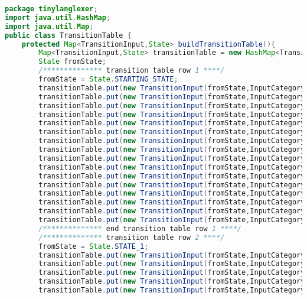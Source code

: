 \begin{lstlisting}[basicstyle=\miniscule,language=Java,caption=Implementation of transition table,label=listing:transition table]
package tinylanglexer;
import java.util.HashMap;
import java.util.Map;
public class TransitionTable {
	protected Map<TransitionInput,State> buildTransitionTable(){
		Map<TransitionInput,State> transitionTable = new HashMap<TransitionInput,State>();
		State fromState;
		/************** transition table row 1 ****/
		fromState = State.STARTING_STATE;
		transitionTable.put(new TransitionInput(fromState,InputCategory.LETTER), State.STATE_4);
		transitionTable.put(new TransitionInput(fromState,InputCategory.DIGIT), State.STATE_11);
		transitionTable.put(new TransitionInput(fromState,InputCategory.UNDERSCORE), State.STATE_4);
		transitionTable.put(new TransitionInput(fromState,InputCategory.SLASH_DIVIDE), State.STATE_5);
		transitionTable.put(new TransitionInput(fromState,InputCategory.ASTERISK), State.STATE_14);
		transitionTable.put(new TransitionInput(fromState,InputCategory.LESS_THAN), State.STATE_16);
		transitionTable.put(new TransitionInput(fromState,InputCategory.GREATER_THAN), State.STATE_16);
		transitionTable.put(new TransitionInput(fromState,InputCategory.PLUS), State.STATE_14);
		transitionTable.put(new TransitionInput(fromState,InputCategory.HYPHEN_MINUS), State.STATE_15);
		transitionTable.put(new TransitionInput(fromState,InputCategory.EQUAL), State.STATE_16);
		transitionTable.put(new TransitionInput(fromState,InputCategory.EXCLAMATION_MARK), State.STATE_17);
		transitionTable.put(new TransitionInput(fromState,InputCategory.DOT), State.STATE_ERROR);
		transitionTable.put(new TransitionInput(fromState,InputCategory.SINGLE_QUOTE), State.STATE_1);
		transitionTable.put(new TransitionInput(fromState,InputCategory.PUNCT), State.STATE_10);
		transitionTable.put(new TransitionInput(fromState,InputCategory.OTHER_PRINTABLE), State.STATE_ERROR);
		transitionTable.put(new TransitionInput(fromState,InputCategory.LINE_FEED), State.STATE_ERROR);
		/************** end transition table row 1 ****/
		/************** transition table row 2 ****/
		fromState = State.STATE_1;
		transitionTable.put(new TransitionInput(fromState,InputCategory.LETTER), State.STATE_2);
		transitionTable.put(new TransitionInput(fromState,InputCategory.DIGIT), State.STATE_2);
		transitionTable.put(new TransitionInput(fromState,InputCategory.UNDERSCORE), State.STATE_2);
		transitionTable.put(new TransitionInput(fromState,InputCategory.SLASH_DIVIDE), State.STATE_2);
		transitionTable.put(new TransitionInput(fromState,InputCategory.ASTERISK), State.STATE_2);

\end{lstlisting}
